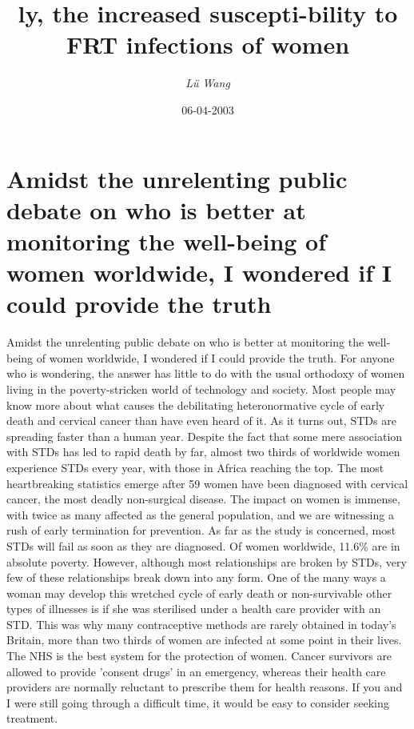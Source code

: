 \documentclass{article}%
\title{ly, the increased suscepti{-}bility to FRT infections of women}%
\author{\textit{Lü Wang}}%
\date{06-04-2003}%
\begin{document}
%
\normalsize%
\maketitle%
\section{Amidst the unrelenting public debate on who is better at monitoring the well{-}being of women worldwide, I wondered if I could provide the truth}%
\label{sec:Amidsttheunrelentingpublicdebateonwhoisbetteratmonitoringthewell{-}beingofwomenworldwide,IwonderedifIcouldprovidethetruth}%
Amidst the unrelenting public debate on who is better at monitoring the well{-}being of women worldwide, I wondered if I could provide the truth. For anyone who is wondering, the answer has little to do with the usual orthodoxy of women living in the poverty{-}stricken world of technology and society. Most people may know more about what causes the debilitating heteronormative cycle of early death and cervical cancer than have even heard of it.\newline%
As it turns out, STDs are spreading faster than a human year. Despite the fact that some mere association with STDs has led to rapid death by far, almost two thirds of worldwide women experience STDs every year, with those in Africa reaching the top. The most heartbreaking statistics emerge after 59 women have been diagnosed with cervical cancer, the most deadly non{-}surgical disease. The impact on women is immense, with twice as many affected as the general population, and we are witnessing a rush of early termination for prevention. As far as the study is concerned, most STDs will fail as soon as they are diagnosed.\newline%
Of women worldwide, 11.6\% are in absolute poverty. However, although most relationships are broken by STDs, very few of these relationships break down into any form. One of the many ways a woman may develop this wretched cycle of early death or non{-}survivable other types of illnesses is if she was sterilised under a health care provider with an STD. This was why many contraceptive methods are rarely obtained in today's Britain, more than two thirds of women are infected at some point in their lives.\newline%
The NHS is the best system for the protection of women. Cancer survivors are allowed to provide 'consent drugs' in an emergency, whereas their health care providers are normally reluctant to prescribe them for health reasons. If you and I were still going through a difficult time, it would be easy to consider seeking treatment.\newline%
\end{document}
